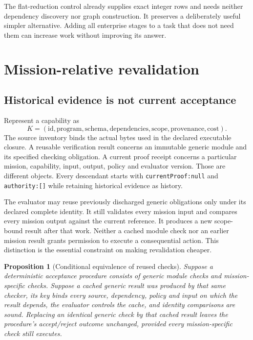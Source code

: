 \documentclass[11pt]{article}
\newtheorem{proposition}{Proposition}
\begin{document}
The flat-reduction control already supplies exact integer rows and needs neither dependency discovery nor graph construction. It preserves a deliberately useful simpler alternative. Adding all enterprise stages to a task that does not need them can increase work without improving its answer.

\section{Mission-relative revalidation}

\subsection{Historical evidence is not current acceptance}

Represent a capability as
\[
K=(\mathrm{id},\mathrm{program},\mathrm{schema},\mathrm{dependencies},\mathrm{scope},
\mathrm{provenance},\mathrm{cost}).
\]
The source inventory binds the actual bytes used in the declared executable closure. A reusable verification result concerns an immutable generic module and its specified checking obligation. A current proof receipt concerns a particular mission, capability, input, output, policy and evaluator version. Those are different objects. Every descendant starts with \texttt{currentProof:null} and \texttt{authority:[]} while retaining historical evidence as history.

The evaluator may reuse previously discharged generic obligations only under its declared complete identity. It still validates every mission input and compares every mission output against the current reference. It produces a new scope-bound result after that work. Neither a cached module check nor an earlier mission result grants permission to execute a consequential action. This distinction is the essential constraint on making revalidation cheaper.

\begin{proposition}[Conditional equivalence of reused checks]
Suppose a deterministic acceptance procedure consists of generic module checks and mission-specific checks. Suppose a cached generic result was produced by that same checker, its key binds every source, dependency, policy and input on which the result depends, the evaluator controls the cache, and identity comparisons are sound. Replacing an identical generic check by that cached result leaves the procedure's accept/reject outcome unchanged, provided every mission-specific check still executes.
\end{proposition}
\end{document}
